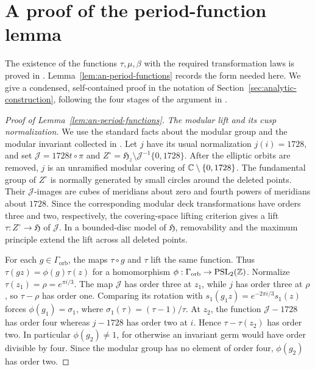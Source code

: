 \section{A proof of the period-function lemma}
\label{app:period-torsor}

The existence of the functions $\tau,\mu,\beta$ with the required
transformation laws is proved in \citep[Theorem~3.4]{Alpoge2026}.
Lemma~\ref{lem:an-period-functions} records the form needed here.  We give a
condensed, self-contained proof in the notation of
Section~\ref{sec:analytic-construction}, following the four stages of the
argument in \citep[Sections~3.1--3.4]{Alpoge2026}.

\begin{proof}[Proof of Lemma~\ref{lem:an-period-functions}]
\smallskip
\noindent\emph{The modular lift and its cusp normalization.}
We use the standard facts about the modular group and the modular invariant
collected in
\citep[Chapter~VII, Sections~1.1--1.2 and~3.1--3.3]{Serre1973}.  Let $j$ have its usual
normalization $j(i)=1728$, and set $\mathcal J=1728t\circ\pi$ and
$Z^\circ=\mathfrak H_z\setminus\mathcal J^{-1}\{0,1728\}$.
After the elliptic orbits are removed, $j$ is an unramified modular
covering of $\mathbb C\setminus\{0,1728\}$.  The fundamental group of
$Z^\circ$ is normally generated by small circles around the deleted
points.  Their $\mathcal J$-images are cubes of meridians about zero and fourth
powers of meridians about $1728$.  Since the corresponding modular deck
transformations have orders three and two, respectively, the
covering-space lifting criterion gives a lift
$\tau:Z^\circ\to\mathfrak H$ of $\mathcal J$.  In a bounded-disc model of
$\mathfrak H$, removability and the maximum principle extend the lift
across all deleted points.

For each $g\in\Gamma_{\mathrm{orb}}$, the maps $\tau\circ g$ and $\tau$ lift the
same function.  Thus $\tau(gz)=\phi(g)\tau(z)$ for a homomorphism
$\phi:\Gamma_{\mathrm{orb}}\to\operatorname{PSL}_2(\mathbb Z)$.  Normalize
$\tau(z_1)=\rho=e^{\pi i/3}$.  The map $\mathcal J$ has order three at
$z_1$, while $j$ has order three at $\rho$, so $\tau-\rho$ has
order one.  Comparing its rotation with
$s_1(g_1z)=e^{-2\pi i/3}s_1(z)$ forces
$\phi(g_1)=\sigma_1$, where
$\sigma_1(\tau)=(\tau-1)/\tau$.
At $z_2$, the function $\mathcal J-1728$ has order four whereas
$j-1728$ has order two at $i$.  Hence $\tau-\tau(z_2)$ has order
two.  In particular $\phi(g_2)\ne1$, for otherwise an invariant germ
would have order divisible by four.  Since the modular group has no
element of order four, $\phi(g_2)$ has order two.


\end{proof}
